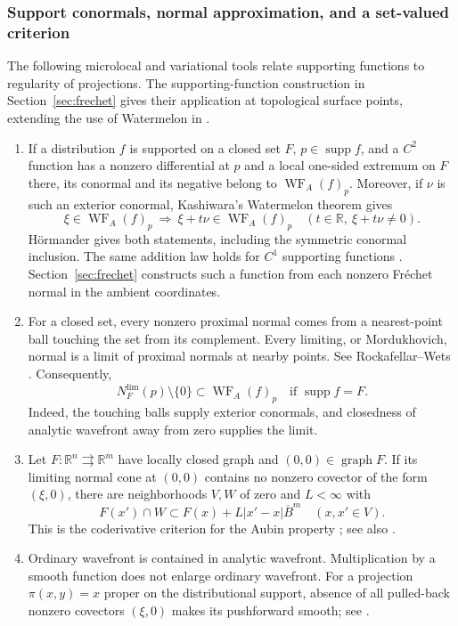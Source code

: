 \documentclass[11pt]{article}
\newcommand{\R}{\mathbb R}
\newcommand{\WF}{\operatorname{WF}_{A}}
\newcommand{\supp}{\operatorname{supp}}
\begin{document}
\subsubsection{Support conormals, normal approximation, and a set-valued criterion}
The following microlocal and variational tools relate supporting functions to regularity of projections. The supporting-function construction in Section~\ref{sec:frechet} gives their application at topological surface points, extending the use of Watermelon in \cite[Lemma 5.3 and Proposition 5.1, pp.~8--10]{GHL}.
\begin{enumerate}
\item If a distribution $f$ is supported on a closed set $F$, $p\in\supp f$, and a $C^2$ function has a nonzero differential at $p$ and a local one-sided extremum on $F$ there, its conormal and its negative belong to $\WF(f)_p$. Moreover, if $\nu$ is such an exterior conormal, Kashiwara's Watermelon theorem gives
\begin{equation}\label{watermelon}
 \xi\in\WF(f)_p\ \Longrightarrow\ 
 \xi+t\nu\in\WF(f)_p
 \quad(t\in\R,\ \xi+t\nu\ne0).
\end{equation}
H\"ormander \cite[Definition 1.1, equation (1.2), Theorem 2.1]{Horm} gives both statements, including the symmetric conormal inclusion.
The same addition law holds for $C^1$ supporting functions \cite[p.~1226, paragraph after Theorem 2.3]{Horm}. Section~\ref{sec:frechet} constructs such a function from each nonzero Fr\'echet normal in the ambient coordinates.
\item For a closed set, every nonzero proximal normal comes from a nearest-point ball touching the set from its complement. Every limiting, or Mordukhovich, normal is a limit of proximal normals at nearby points. See Rockafellar--Wets \cite[Example 6.16, Exercise 6.18(a)]{RW}. Consequently,
\begin{equation}\label{normalWF}
 N_F^{\mathrm{lim}}(p)\setminus\{0\}\subset\WF(f)_p
 \quad\text{if }\supp f=F.
\end{equation}
Indeed, the touching balls supply exterior conormals, and closedness of analytic wavefront away from zero supplies the limit.
\item Let $F:\R^n\rightrightarrows\R^m$ have locally closed graph and $(0,0)\in\operatorname{graph}F$. If its limiting normal cone at $(0,0)$ contains no nonzero covector of the form $(\xi,0)$, there are neighborhoods $V,W$ of zero and $L<\infty$ with
\begin{equation}\label{aubin}
 F(x')\cap W\subset F(x)+L|x'-x|\overline B^m
 \quad(x,x'\in V).
\end{equation}
This is the coderivative criterion for the Aubin property \cite[Theorem 9.40]{RW}; see also \cite[Definition 7, Proposition 8]{DP}.
\item Ordinary wavefront is contained in analytic wavefront. Multiplication by a smooth function does not enlarge ordinary wavefront. For a projection $\pi(x,y)=x$ proper on the distributional support, absence of all pulled-back nonzero covectors $(\xi,0)$ makes its pushforward smooth; see \cite[Corollary 6.2, Theorem 6.3]{BDH}.
\end{enumerate}
\end{document}
